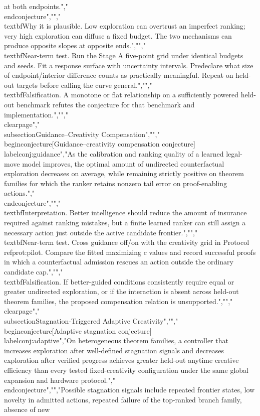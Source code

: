 {{{at both endpoints.","\\end{conjecture}","","\\textbf{Why it is plausible.} Low exploration can overtrust an imperfect ranking; very high exploration can diffuse a fixed budget. The two mechanisms can produce opposite slopes at opposite ends.","","\\textbf{Near-term test.} Run the Stage A five-point grid under identical budgets and seeds. Fit a response surface with uncertainty intervals. Predeclare what size of endpoint/interior difference counts as practically meaningful. Repeat on held-out targets before calling the curve general.","","\\textbf{Falsification.} A monotone or flat relationship on a sufficiently powered held-out benchmark refutes the conjecture for that benchmark and implementation.","","\\clearpage","\\subsection{Guidance--Creativity Compensation}","","\\begin{conjecture}[Guidance--creativity compensation conjecture]\\label{conj:guidance}","As the calibration and ranking quality of a learned legal-move model improves, the optimal amount of undirected counterfactual exploration decreases on average, while remaining strictly positive on theorem families for which the ranker retains nonzero tail error on proof-enabling actions.","\\end{conjecture}","","\\textbf{Interpretation.} Better intelligence should reduce the amount of insurance required against ranking mistakes, but a finite learned ranker can still assign a necessary action just outside the active candidate frontier.","","\\textbf{Near-term test.} Cross guidance off/on with the creativity grid in Protocol~\\ref{prot:pilot}. Compare the fitted maximizing $c$ values and record successful proofs in which a counterfactual admission rescues an action outside the ordinary candidate cap.","","\\textbf{Falsification.} If better-guided conditions consistently require equal or greater undirected exploration, or if the interaction is absent across held-out theorem families, the proposed compensation relation is unsupported.","","\\clearpage","\\subsection{Stagnation-Triggered Adaptive Creativity}","","\\begin{conjecture}[Adaptive stagnation conjecture]\\label{conj:adaptive}","On heterogeneous theorem families, a controller that increases exploration after well-defined stagnation signals and decreases exploration after verified progress achieves greater held-out anytime creative efficiency than every tested fixed-creativity configuration under the same global expansion and hardware protocol.","\\end{conjecture}","","Possible stagnation signals include repeated frontier states, low novelty in admitted actions, repeated failure of the top-ranked branch family, absence of new }}}
